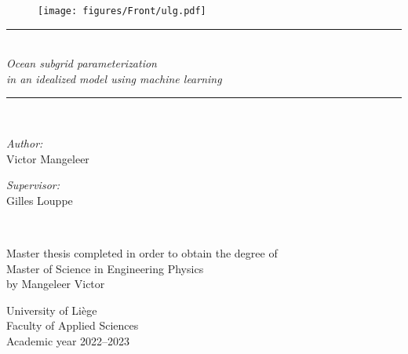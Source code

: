 \documentclass[12pt]{article}
\newcommand{\HRule}{\rule{\linewidth}{0.5mm}}
\begin{document}
\begin{titlepage}
\begin{center}

	\begin{figure}
    	\texttt{[image: figures/Front/ulg.pdf]}
    	\label{fig: Front Page}
    	\vspace{3.5cm}
	\end{figure}
    
    \vspace{5cm}
    \HRule \\[0.2cm]
    \vspace{4mm}
    \textit{{\LARGE\textcolor{title_color}{Ocean subgrid parameterization}}} \\
    \vspace{5mm}
    \textit{\Large{in an idealized model using machine learning}}
    \vspace{3mm}
    \\[0.0cm]\HRule
    \\[2cm]
    
    \begin{minipage}[b]{0.4\textwidth}
        \begin{flushleft} \large
        \emph{Author:}\\
        \textcolor{title_color}{Victor Mangeleer}
        \end{flushleft}
    \end{minipage}
    \begin{minipage}[b]{0.4\textwidth}
        \begin{flushright} \large
        \emph{Supervisor:} \\
        \textcolor{title_color}{Gilles Louppe}
        \end{flushright}
    \end{minipage}\\
	\vspace{30mm}

    \large{Master thesis completed in order to obtain the degree of}\\
    \large{Master of Science in Engineering Physics}\\
    \large{by Mangeleer Victor}\\
    
	\vfill
	
    \large{\textcolor{title_color}{University of Liège}}\\
    \vspace{2mm}
    \large{Faculty of Applied Sciences}\\
	\vspace{2mm}
    Academic year 2022--2023
\end{center}
\end{titlepage}
\pagebreak
\end{document}
